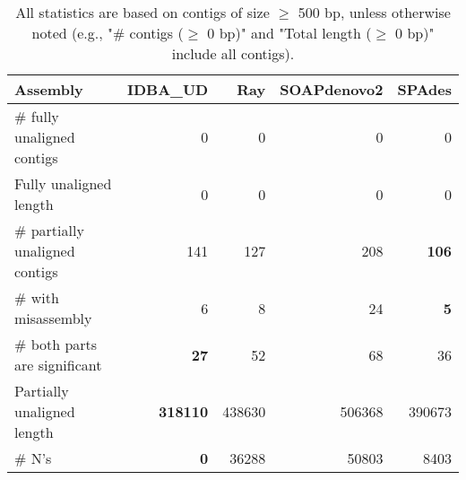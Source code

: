 \documentclass[12pt,a4paper]{article}
\begin{document}
\begin{table}[ht]
\begin{center}
\caption{All statistics are based on contigs of size $\geq$ 500 bp, unless otherwise noted (e.g., "\# contigs ($\geq$ 0 bp)" and "Total length ($\geq$ 0 bp)" include all contigs).}
\begin{tabular}{|l*{4}{|r}|}
\hline
Assembly & IDBA\_UD & Ray & SOAPdenovo2 & SPAdes \\ \hline
\# fully unaligned contigs & 0 & 0 & 0 & 0 \\ \hline
Fully unaligned length & 0 & 0 & 0 & 0 \\ \hline
\# partially unaligned contigs & 141 & 127 & 208 & {\bf 106} \\ \hline
\hspace{5mm}\# with misassembly & 6 & 8 & 24 & {\bf 5} \\ \hline
\hspace{5mm}\# both parts are significant & {\bf 27} & 52 & 68 & 36 \\ \hline
Partially unaligned length & {\bf 318110} & 438630 & 506368 & 390673 \\ \hline
\# N's & {\bf 0} & 36288 & 50803 & 8403 \\ \hline
\end{tabular}
\end{center}
\end{table}
\end{document}
